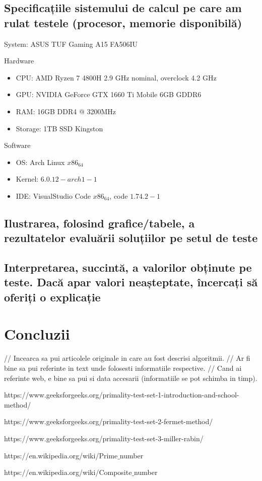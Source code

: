 \documentclass[runningheads]{llncs}
\begin{document}
\subsection{Specificațiile sistemului de calcul pe care am rulat testele (procesor, memorie disponibilă)}

System: ASUS TUF Gaming A15 FA506IU \newline

Hardware
\begin{itemize}
    \item CPU: AMD Ryzen 7 4800H 2.9 GHz nominal, overclock 4.2 GHz
    \item GPU: NVIDIA GeForce GTX 1660 Ti Mobile 6GB GDDR6
    \item RAM: 16GB DDR4 @ 3200MHz
    \item Storage: 1TB SSD Kingston
\end{itemize}

Software
\begin{itemize}
    \item OS: Arch Linux $x86_64$
    \item Kernel: $6.0.12-arch1-1$
    \item IDE: VisualStudio Code $x86_64$, code $1.74.2-1$
\end{itemize}

\subsection{Ilustrarea, folosind grafice/tabele, a rezultatelor evaluării soluțiilor pe setul de teste}



\subsection{Interpretarea, succintă, a valorilor obținute pe teste. Dacă apar valori neașteptate, încercați să oferiți o explicație}



\section{Concluzii}

// Incearca sa pui articolele originale in care au fost descrisi algoritmii.
// Ar fi bine sa pui referinte in text unde folosesti informatiile respective.
// Cand ai referinte web, e bine sa pui si data accesarii (informatiile se pot schimba in timp).

\begin{thebibliography}{8}
https://www.geeksforgeeks.org/primality-test-set-1-introduction-and-school-method/

https://www.geeksforgeeks.org/primality-test-set-2-fermet-method/

https://www.geeksforgeeks.org/primality-test-set-3-miller-rabin/

https://en.wikipedia.org/wiki/Prime$\_$number

https://en.wikipedia.org/wiki/Composite$\_$number

\end{thebibliography}
\end{document}
